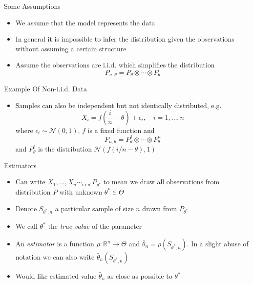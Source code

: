 \documentclass{beamer}
\begin{document}
\begin{frame}{Some Assumptions}
\begin{itemize} 
 \item We assume that the model represents the data 
 \item In general it is impossible to infer the distribution given the observations without assuming a certain structure 
 \item Assume the observations are i.i.d. which simplifies the distribution
 \begin{displaymath} 
  P_{n, \theta} = P_{\theta} \otimes \cdots \otimes  P_{\theta}  
 \end{displaymath}
\end{itemize}
\end{frame}

\begin{frame}{Example Of Non-i.i.d. Data}
\begin{itemize} 
 \item Samples can also be independent but not identically distributed, e.g. 
 \begin{displaymath} 
  X_i = f\left(\frac{i}{n} - \theta  \right) + \epsilon_i, \quad i = 1,\ldots, n
 \end{displaymath}
 where $\epsilon_i \sim \mathcal{N}(0, 1)$, $f$ is a fixed function and 
 \begin{displaymath} 
  P_{n, \theta} = P_{\theta}^1 \otimes \cdots \otimes  P_{\theta}^n  
 \end{displaymath}
  and $P^i_\theta$ is the distribution $\mathcal{N}(f(i/n - \theta), 1)$ 
\end{itemize}
\end{frame}


\begin{frame}{Estimators} 
\begin{itemize} 
\item Can write $X_1, \ldots, X_n \sim_{i.i.d.} P_{\theta^*}$ to mean we draw all observations from distribution $P$ with unknown $\theta^* \in \Theta$
\item Denote $S_{\theta^*,n}$ a particular sample of size $n$ drawn from $P_{\theta^*}$ 
\item We call $\theta^*$ the \emph{true value} of the parameter
\item An \emph{estimator} is a function $\rho: \mathbb{R}^n \rightarrow \Theta$ and $\bar{\theta}_n = \rho(S_{\theta^*,n})$. In a slight abuse of notation we can also write $\bar{\theta}_n(S_{\theta^*,n})$
\item Would like estimated value $\bar{\theta}_n$ as close as possible to $\theta^*$
\end{itemize}
\end{frame}
\end{document}

